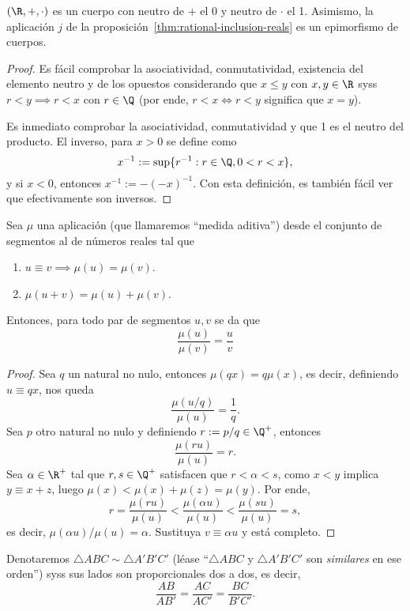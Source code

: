 \documentclass[11pt,a4paper]{book}
\begin{document}
\begin{thm}
$(\R,+,\cdot)$ es un cuerpo con neutro de $+$ el 0 y neutro de $\cdot$ el 1. Asimismo, la aplicación $j$ de la proposición~\ref{thm:rational-inclusion-reals} es un epimorfismo de cuerpos.
\end{thm}
\begin{proof}
Es fácil comprobar la asociatividad, conmutatividad, existencia del elemento neutro y de los opuestos considerando que $x\leq y$ con $x,y\in\R$ syss $r<y\implies r<x$ con $r\in\Q$ (por ende, $r<x\iff r<y$ significa que $x=y$).

Es inmediato comprobar la asociatividad, conmutatividad y que 1 es el neutro del producto. El inverso, para $x>0$ se define como
	$$x^{-1}:=\sup\{r^{-1}:r\in\Q,0<r<x\},$$
y si $x<0$, entonces $x^{-1}:=-(-x)^{-1}$. Con esta definición, es también fácil ver que efectivamente son inversos.
\end{proof}
\begin{thm}
Sea $\mu$ una aplicación (que llamaremos ``medida aditiva'') desde el conjunto de segmentos al de números reales tal que
\begin{enumerate}[$a)$]
	\item $u\equiv v\implies \mu(u)=\mu(v)$.
	\item $\mu(u+v)=\mu(u)+\mu(v)$.
\end{enumerate}
Entonces, para todo par de segmentos $u,v$ se da que
$$\frac{\mu(u)}{\mu(v)}=\frac{u}{v}$$
\end{thm}
\begin{proof}
Sea $q$ un natural no nulo, entonces $\mu(qx)=q\mu(x)$, es decir, definiendo $u\equiv qx$, nos queda
$$\frac{\mu(u/q)}{\mu(u)}=\frac{1}{q}.$$
Sea $p$ otro natural no nulo y definiendo $r:=p/q\in\Q^+$, entonces
$$\frac{\mu(ru)}{\mu(u)}=r.$$
Sea $\alpha\in\R^+$ tal que $r,s\in\Q^+$ satisfacen que $r<\alpha<s$, como $x<y$ implica $y\equiv x+z$, luego $\mu(x)<\mu(x)+\mu(z)=\mu(y)$. Por ende,
$$r=\frac{\mu(ru)}{\mu(u)}<\frac{\mu(\alpha u)}{\mu(u)}<\frac{\mu(su)}{\mu(u)}=s,$$
es decir, $\mu(\alpha u)/\mu(u)=\alpha$. Sustituya $v\equiv\alpha u$ y está completo.
\end{proof}
\begin{mydef}
Denotaremos $\triangle ABC\sim\triangle A'B'C'$ (léase ``$\triangle ABC$ y $\triangle A'B'C'$ son \textit{similares} en ese orden'') syss sus lados son proporcionales dos a dos, es decir,
$$\frac{AB}{AB'}=\frac{AC}{AC'}=\frac{BC}{B'C'}.$$
\end{mydef}
\end{document}
